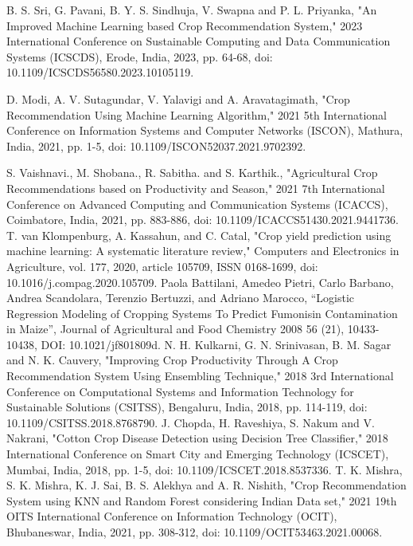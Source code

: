 \begin{thebibliography}{99}

 B. S. Sri, G. Pavani, B. Y. S. Sindhuja, V. Swapna and P. L. Priyanka, "An Improved Machine Learning based Crop Recommendation System," 2023 International Conference on Sustainable Computing and Data Communication Systems (ICSCDS), Erode, India, 2023, pp. 64-68, doi: 10.1109/ICSCDS56580.2023.10105119.

 D. Modi, A. V. Sutagundar, V. Yalavigi and A. Aravatagimath, "Crop Recommendation Using Machine Learning Algorithm," 2021 5th International Conference on Information Systems and Computer Networks (ISCON), Mathura, India, 2021, pp. 1-5, doi: 10.1109/ISCON52037.2021.9702392.

S. Vaishnavi., M. Shobana., R. Sabitha. and S. Karthik., "Agricultural Crop Recommendations based on Productivity and Season," 2021 7th International Conference on Advanced Computing and Communication Systems (ICACCS), Coimbatore, India, 2021, pp. 883-886, doi: 10.1109/ICACCS51430.2021.9441736.
T. van Klompenburg, A. Kassahun, and C. Catal, "Crop yield prediction using machine learning: A systematic literature review," Computers and Electronics in Agriculture, vol. 177, 2020, article 105709, ISSN 0168-1699, doi: 10.1016/j.compag.2020.105709.
Paola Battilani, Amedeo Pietri, Carlo Barbano, Andrea Scandolara, Terenzio Bertuzzi, and Adriano Marocco, “Logistic Regression Modeling of Cropping Systems To Predict Fumonisin Contamination in Maize”, Journal of Agricultural and Food Chemistry 2008 56 (21), 10433-10438, DOI: 10.1021/jf801809d.
N. H. Kulkarni, G. N. Srinivasan, B. M. Sagar and N. K. Cauvery, "Improving Crop Productivity Through A Crop Recommendation System Using Ensembling Technique," 2018 3rd International Conference on Computational Systems and Information Technology for Sustainable Solutions (CSITSS), Bengaluru, India, 2018, pp. 114-119, doi: 10.1109/CSITSS.2018.8768790.
J. Chopda, H. Raveshiya, S. Nakum and V. Nakrani, "Cotton Crop Disease Detection using Decision Tree Classifier," 2018 International Conference on Smart City and Emerging Technology (ICSCET), Mumbai, India, 2018, pp. 1-5, doi: 10.1109/ICSCET.2018.8537336.
T. K. Mishra, S. K. Mishra, K. J. Sai, B. S. Alekhya and A. R. Nishith, "Crop Recommendation System using KNN and Random Forest considering Indian Data set," 2021 19th OITS International Conference on Information Technology (OCIT), Bhubaneswar, India, 2021, pp. 308-312, doi: 10.1109/OCIT53463.2021.00068.

\end{thebibliography}

